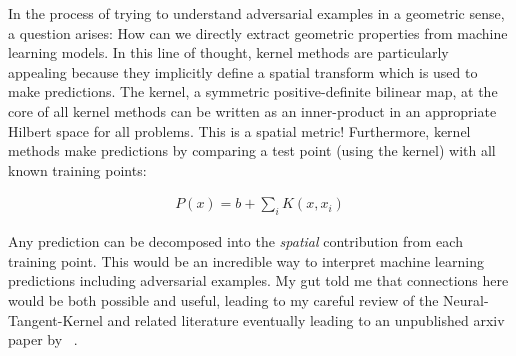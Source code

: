 






In the process of trying to understand adversarial examples in a
geometric sense, a question arises: How can we directly extract
geometric properties from machine learning models. In this line of
thought, kernel methods are particularly appealing because they
implicitly define a spatial transform which is used to make
predictions. The kernel, a symmetric positive-definite bilinear map,
at the core of all kernel methods can be written as an inner-product
in an appropriate Hilbert space for all problems. This is a spatial
metric! Furthermore, kernel methods make predictions by comparing a
test point (using the kernel) with all known training points:

\begin{align}
  P(x) = b + \sum_i K(x, x_i)
\end{align}

Any prediction can be decomposed into the \emph{spatial}
contribution from each training point. This would be an incredible way
to interpret machine learning predictions including adversarial
examples. My gut told me that connections here would be both possible
and useful, leading to my careful review of the Neural-Tangent-Kernel
and related literature eventually leading to an unpublished arxiv
paper by ~\citet{domingos2020every}. 

